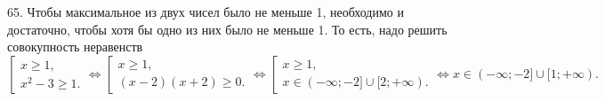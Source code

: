 65. Чтобы максимальное из двух чисел было не меньше 1, необходимо и достаточно, чтобы хотя бы одно из них было не меньше 1. То есть, надо решить совокупность неравенств\\ $\left[\begin{array}{l}x\geqslant 1,\\ x^2-3 \geqslant1 .  \end{array}\right.\Leftrightarrow
\left[\begin{array}{l}x\geqslant 1,\\ (x-2)(x+2) \geqslant 0 .  \end{array}\right.\Leftrightarrow
\left[\begin{array}{l}x\geqslant 1,\\ x\in (-\infty;-2]\cup[2;+\infty).  \end{array}\right.\Leftrightarrow
x\in (-\infty;-2]\cup[1;+\infty).$\\
